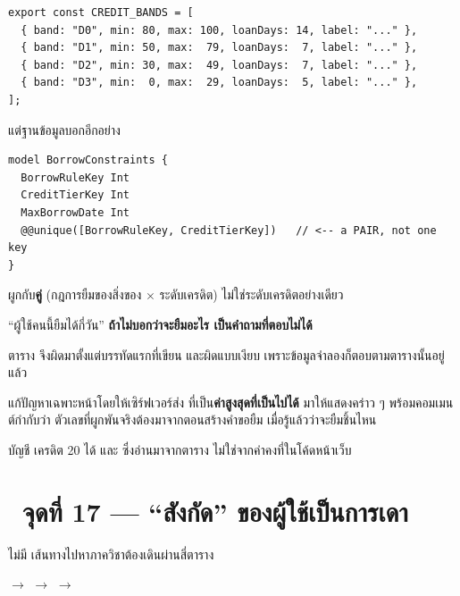 \begin{lstlisting}
export const CREDIT_BANDS = [
  { band: "D0", min: 80, max: 100, loanDays: 14, label: "..." },
  { band: "D1", min: 50, max:  79, loanDays:  7, label: "..." },
  { band: "D2", min: 30, max:  49, loanDays:  7, label: "..." },
  { band: "D3", min:  0, max:  29, loanDays:  5, label: "..." },
];
\end{lstlisting}

แต่ฐานข้อมูลบอกอีกอย่าง

\begin{lstlisting}[language={}]
model BorrowConstraints {
  BorrowRuleKey Int
  CreditTierKey Int
  MaxBorrowDate Int
  @@unique([BorrowRuleKey, CreditTierKey])   // <-- a PAIR, not one key
}
\end{lstlisting}

 ผูกกับ\textbf{คู่} (กฎการยืมของสิ่งของ $\times$ ระดับเครดิต)
ไม่ใช่ระดับเครดิตอย่างเดียว

\begin{badbox}[title={คำถามที่ไม่มีคำตอบเดียว}]
``ผู้ใช้คนนี้ยืมได้กี่วัน'' \textbf{ถ้าไม่บอกว่าจะยืมอะไร เป็นคำถามที่ตอบไม่ได้}

ตาราง  จึงผิดมาตั้งแต่บรรทัดแรกที่เขียน และผิดแบบเงียบ
เพราะข้อมูลจำลองก็ตอบตามตารางนั้นอยู่แล้ว
\end{badbox}

 แก้ปัญหาเฉพาะหน้าโดยให้เซิร์ฟเวอร์ส่ง 
ที่เป็น\textbf{ค่าสูงสุดที่เป็นไปได้} มาให้แสดงคร่าว ๆ พร้อมคอมเมนต์กำกับว่า
ตัวเลขที่ผูกพันจริงต้องมาจากตอนสร้างคำขอยืม เมื่อรู้แล้วว่าจะยืมชิ้นไหน

\begin{goodbox}[title={ทดสอบแล้วว่าตัวเลขมาจากฐานข้อมูลจริง}]
บัญชี  เครดิต 20 ได้ 
และ  ซึ่งอ่านมาจากตาราง ไม่ใช่จากค่าคงที่ในโค้ดหน้าเว็บ
\end{goodbox}

\section{\pone\ จุดที่ 17 --- ``สังกัด'' ของผู้ใช้เป็นการเดา}

 ไม่มี  เส้นทางไปหาภาควิชาต้องเดินผ่านสี่ตาราง

\begin{center}
\footnotesize\sansall
{} $\rightarrow$  $\rightarrow$
 $\rightarrow$ 
\end{center}

